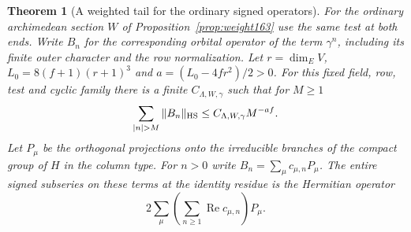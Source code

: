 \documentclass[a4paper,11pt]{article}
\newtheorem{theorem}[proposition]{Theorem}
\theoremstyle{definition}
\theoremstyle{remark}
\numberwithin{equation}{section}
\begin{document}
\begin{theorem}[A weighted tail for the ordinary signed operators]
\leavevmode\label{thm:diagonaltail536}
For the ordinary archimedean section \(W\) of
Proposition~\ref{prop:weight163} use the same test at both ends.
Write \(B_n\) for the corresponding orbital operator of the
term \(\gamma^n\), including its finite outer character and
the row normalization. Let \(r=\dim_E V\),
\(L_0=8(f+1)(r+1)^3\) and \(a=(L_0-4fr^2)/2>0\).
For this fixed field, row, test and cyclic family there is a
finite \(C_{\Lambda,W,\gamma}\) such that for \(M\ge1\)
\[
             \sum_{|n|>M}\|B_n\|_{\rm HS}
                   \le C_{\Lambda,W,\gamma} M^{-af}.
\]
Let \(P_\mu\) be the orthogonal projections onto the irreducible
branches of the compact group of \(H\) in the column type.
For \(n>0\) write \(B_n=\sum_\mu c_{\mu,n}P_\mu\).
The entire signed subseries on these terms at the identity
residue is the Hermitian operator
\[
             2\sum_\mu\left(\sum_{n\ge1}
                               \operatorname{Re}c_{\mu,n}\right)P_\mu .
\]
\end{theorem}
\end{document}
